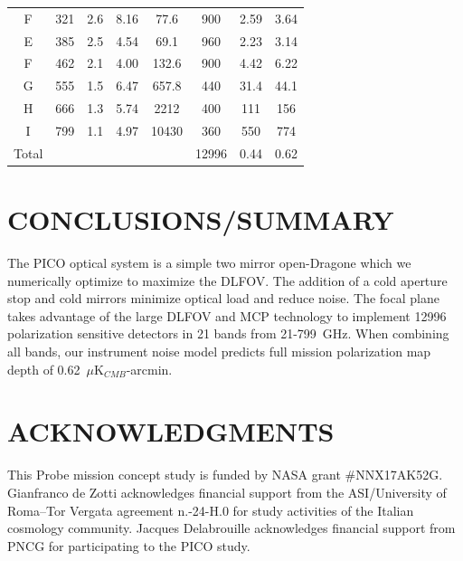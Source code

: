 \documentclass[]{spie}  %
\begin{document}
\begin{table}[ht]
\begin{tabular}{|c|c|c|c|c|c|c|c|}
F     & 321 & 2.6  & 8.16  & 77.6    & 900   & 2.59   & 3.64   \\
E     & 385 & 2.5  & 4.54  & 69.1    & 960   & 2.23   & 3.14   \\
F     & 462 & 2.1  & 4.00  & 132.6   & 900   & 4.42   & 6.22   \\
G     & 555 & 1.5  & 6.47  & 657.8   & 440   & 31.4  & 44.1  \\
H     & 666 & 1.3  & 5.74  & 2212    & 400   & 111 & 156 \\
I     & 799 & 1.1  & 4.97  & 10430   & 360   & 550 & 774 \\ 
\hline
Total &     &      &       &         & 12996 & 0.44   & 0.62  \\
\hline
\end{tabular}
\end{table}


\section{CONCLUSIONS/SUMMARY}

The PICO optical system is a simple two mirror open-Dragone which we numerically optimize to maximize the DLFOV.  The addition of a 
cold aperture stop and cold mirrors minimize optical load and reduce noise.  The focal plane takes advantage of the large DLFOV and MCP 
technology to implement 12996 polarization sensitive detectors in 21 bands from 21-799~GHz.  When combining all bands, our instrument 
noise model predicts full mission polarization map depth of 0.62~$\mu$K$_{CMB}$-arcmin.






\section{ACKNOWLEDGMENTS}

This Probe mission concept study is funded by NASA grant \#NNX17AK52G.  Gianfranco de Zotti acknowledges financial support from the ASI/University of
Roma--Tor Vergata agreement n.-24-H.0 for study activities of the Italian cosmology community. Jacques
Delabrouille acknowledges financial support from PNCG for participating to the PICO study.


\end{document}
